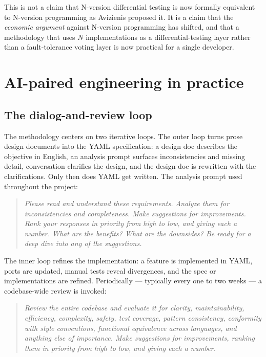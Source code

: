 \documentclass[10pt]{article}
\begin{document}
This is not a claim that N-version differential testing is now formally
equivalent to N-version programming as Avizienis proposed it. It is a
claim that the \emph{economic argument} against N-version programming has
shifted, and that a methodology that uses $N$ implementations as a
differential-testing layer rather than a fault-tolerance voting layer is
now practical for a single developer.

\section{AI-paired engineering in practice}
\label{sec:ai}

\subsection{The dialog-and-review loop}

The methodology centers on two iterative loops. The outer loop turns prose
design documents into the YAML specification: a design doc describes the
objective in English, an analysis prompt surfaces inconsistencies and
missing detail, conversation clarifies the design, and the design doc is
rewritten with the clarifications. Only then does YAML get written. The
analysis prompt used throughout the project:

\begin{quote}
\emph{Please read and understand these requirements. Analyze them for
inconsistencies and completeness. Make suggestions for improvements. Rank
your responses in priority from high to low, and giving each a number.
What are the benefits? What are the downsides? Be ready for a deep dive
into any of the suggestions.}
\end{quote}

The inner loop refines the implementation: a feature is implemented in
YAML, ports are updated, manual tests reveal divergences, and the spec or
implementations are refined. Periodically --- typically every one to two
weeks --- a codebase-wide review is invoked:

\begin{quote}
\emph{Review the entire codebase and evaluate it for clarity,
maintainability, efficiency, complexity, safety, test coverage, pattern
consistency, conformity with style conventions, functional equivalence
across languages, and anything else of importance. Make suggestions for
improvements, ranking them in priority from high to low, and giving each
a number.}
\end{quote}
\end{document}
